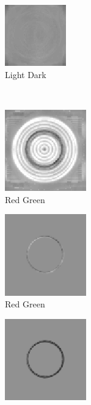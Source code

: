 \documentclass[journal,onecolumn]{IEEEtran}
\begin{document}
{\begin{figure}[H]
\begin{subfigure}[b]{0.25\textwidth}
    \end{subfigure}%
    \begin{subfigure}[b]{0.25\textwidth}
            \centering
            \includegraphics[width=100px, frame]{test-circle-neon-opp-b-ld}
            \caption{Light Dark}
            \label{fig:test-circle-neon-opp-b-ld}
    \end{subfigure}\\
    \begin{subfigure}[b]{0.25\textwidth}
            \centering
            \includegraphics[width=100pt, frame]{test-circle-neon-opp-a-rg}
            \caption{Red Green}
            \label{fig:test-circle-neon-opp-a-rg}
    \end{subfigure}%
    \begin{subfigure}[b]{0.25\textwidth}
            \centering
            \includegraphics[width=100pt, frame]{test-circle-neon-opp-a-rg-mask}
            \caption{Red Green}
            \label{fig:test-circle-neon-opp-a-rg-mask}
    \end{subfigure}%
    \begin{subfigure}[b]{0.25\textwidth}
            \centering
            \includegraphics[width=100pt, frame]{test-circle-neon-opp-b-rg-mask}

\end{subfigure}
\end{figure}}
\end{document}
